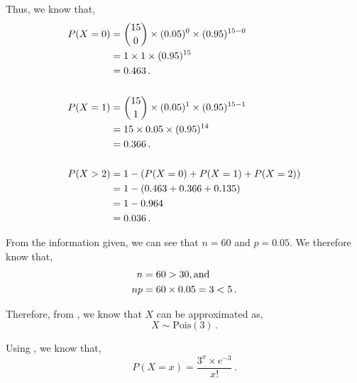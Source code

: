 \begin{subquestions}
\begin{subsubquestions}
\begin{subsubsubquestions}
Thus, we know that,
\begin{align}
	P(X=0) & = { 15 \choose 0} \times (0.05)^0 \times (0.95)^{15-0} \nonumber \\
	       & = 1 \times 1 \times (0.95)^{15} \nonumber \\
	       & = 0.463 \,. \\ \nonumber \\
	P(X=1) & = { 15 \choose 1} \times (0.05)^1 \times (0.95)^{15-1} \nonumber \\
	       & = 15 \times 0.05 \times (0.95)^{14} \nonumber \\
	       & = 0.366 \,. \\ \nonumber \\
	P(X>2) & = 1 - (P(X=0)+P(X=1)+P(X=2)) \nonumber \\
	       & = 1 - (0.463+0.366+0.135) \nonumber \\
	       & = 1 - 0.964 \nonumber \\
	       & = 0.036 \,. 
\end{align}

\end{subsubsubquestions}


\subsubquestion

From the information given, we can see that $n=60$ and $p=0.05$. We therefore know that,
\begin{align}
	n=60 & >30, \text{and} \nonumber \\
	np = 60 & \times 0.05 = 3 < 5 \,.
\end{align}

Therefore, from , we know that $X$ can be approximated as,
\begin{equation}
	X \sim \text{Pois}(3) \,.
\end{equation}

Using , we know that,
\begin{equation}
	P(X = x) =\frac{ 3 ^ x \times e^{-3}}{x!} \,.
\end{equation}


\end{subsubquestions}
\end{subquestions}
